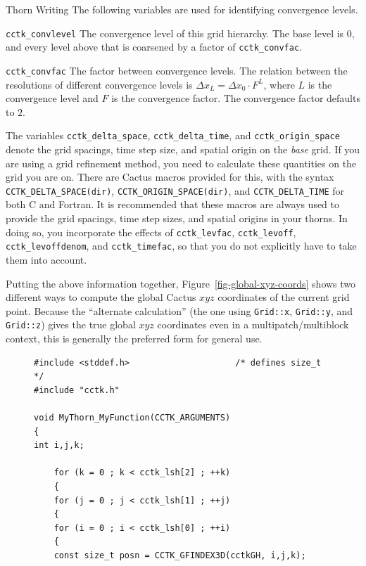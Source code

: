 \begin{cactuspart}{Thorn Writing}
The following variables are used for identifying convergence levels.

\begin{Lentry}
\item [\texttt{cctk\_convlevel}] The convergence level of this grid hierarchy.
        The base level is $0$, and every level above that is
        coarsened by a factor of \texttt{cctk\_convfac}.
\item [\texttt{cctk\_convfac}] The factor between convergence levels.
        The relation between the resolutions of different convergence
        levels is $\Delta x_L = \Delta x_0 \cdot F^L$, where $L$ is the
        convergence level and $F$ is the convergence factor.
        The convergence factor defaults to $2$.
\end{Lentry}

The variables \texttt{cctk\_delta\_space}, \texttt{cctk\_delta\_time}, and
\texttt{cctk\_origin\_space} denote the grid spacings, time step size,
and spatial origin on the \textit{base} grid.  If you are using a grid
refinement method, you need to calculate these quantities on the grid
you are on.  There are Cactus macros provided for this, with the
syntax \texttt{CCTK\_DELTA\_SPACE(dir)}, \texttt{CCTK\_ORIGIN\_SPACE(dir)},
and \texttt{CCTK\_DELTA\_TIME} for both C and Fortran.  It is recommended
that these macros are always used to provide the grid spacings, time
step sizes, and spatial origins in your thorns.  In doing so, you
incorporate the effects of \texttt{cctk\_levfac}, \texttt{cctk\_levoff},
\texttt{cctk\_levoffdenom}, and \texttt{cctk\_timefac}, so that you do not
explicitly have to take them into account.

Putting the above information together, Figure~\ref{fig-global-xyz-coords}
shows two different ways to compute the global Cactus $xyz$ coordinates
of the current grid point.  Because the ``alternate calculation'' (the
one using \verb|Grid::x|, \verb|Grid::y|, and \verb|Grid::z|) gives the
true global $xyz$ coordinates even in a multipatch/multiblock context,
this is generally the preferred form for general use.

\begin{figure}[bp]
\begin{verbatim}
#include <stddef.h>                     /* defines size_t */
#include "cctk.h"

void MyThorn_MyFunction(CCTK_ARGUMENTS)
{
int i,j,k;

    for (k = 0 ; k < cctk_lsh[2] ; ++k)
    {
    for (j = 0 ; j < cctk_lsh[1] ; ++j)
    {
    for (i = 0 ; i < cctk_lsh[0] ; ++i)
    {
    const size_t posn = CCTK_GFINDEX3D(cctkGH, i,j,k);


\end{verbatim}
\end{figure}
\end{cactuspart}
